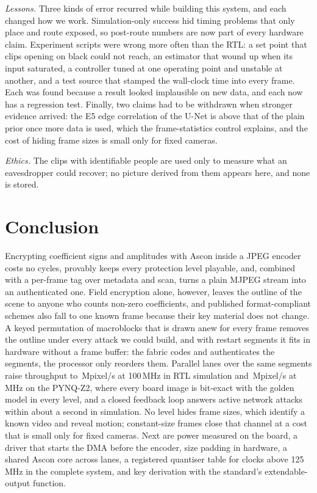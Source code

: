 \textit{Lessons.} Three kinds of error recurred while building this system, and each changed how we work. Simulation-only success hid timing problems that only place and route exposed, so post-route numbers are now part of every hardware claim. Experiment scripts were wrong more often than the RTL: a set point that clips opening on black could not reach, an estimator that wound up when its input saturated, a controller tuned at one operating point and unstable at another, and a test source that stamped the wall-clock time into every frame. Each was found because a result looked implausible on new data, and each now has a regression test. Finally, two claims had to be withdrawn when stronger evidence arrived: the E5 edge correlation of the U-Net is above that of the plain prior once more data is used, which the frame-statistics control explains, and the cost of hiding frame sizes is small only for fixed cameras.

\textit{Ethics.} The clips with identifiable people are used only to measure what an eavesdropper could recover; no picture derived from them appears here, and none is stored.

\section{Conclusion}\label{sec:conclusion}
Encrypting coefficient signs and amplitudes with Ascon inside a JPEG encoder costs no cycles, provably keeps every protection level playable, and, combined with a per-frame tag over metadata and scan, turns a plain MJPEG stream into an authenticated one. Field encryption alone, however, leaves the outline of the scene to anyone who counts non-zero coefficients, and published format-compliant schemes also fall to one known frame because their key material does not change. A keyed permutation of macroblocks that is drawn anew for every frame removes the outline under every attack we could build, and with restart segments it fits in hardware without a frame buffer: the fabric codes and authenticates the segments, the processor only reorders them. Parallel lanes over the same segments raise throughput to \RtlFourLanesMpix\,Mpixel/s at 100\,MHz in RTL simulation and \BdFourBusyMpix\,Mpixel/s at \BdFourMhz\,MHz on the PYNQ-Z2, where every board image is bit-exact with the golden model in every level, and a closed feedback loop answers active network attacks within about a second in simulation. No level hides frame sizes, which identify a known video and reveal motion; constant-size frames close that channel at a cost that is small only for fixed cameras. Next are power measured on the board, a driver that starts the DMA before the encoder, size padding in hardware, a shared Ascon core across lanes, a registered quantiser table for clocks above 125\,MHz in the complete system, and key derivation with the standard's extendable-output function.
